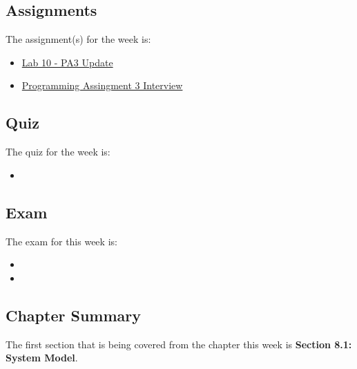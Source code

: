 \subsection{Assignments}

The assignment(s) for the week is:

\begin{itemize}
    \item \href{https://github.com/cu-cspb-3753-fall-2024/pa3-QuantumCompiler}{Lab 10 - PA3 Update}
    \item \href{https://applied.cs.colorado.edu/mod/scheduler/view.php?id=64704}{Programming Assingment 3 Interview}
\end{itemize}

\subsection{Quiz}

The quiz for the week is:

\begin{itemize}
    \item {}
\end{itemize}

\subsection{Exam}

The exam for this week is:

\begin{itemize}
    \item {}
    \item {}
\end{itemize}

\newpage

\subsection{Chapter Summary}

The first section that is being covered from the chapter this week is \textbf{Section 8.1: System Model}.

